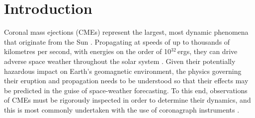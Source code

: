 \documentclass[referee,a4paper,12pt,traditabstract]{swsc}
\begin{document}
    


   \maketitle

\section{Introduction}

Coronal mass ejections (CMEs) represent the largest, most dynamic phenomena that originate from the Sun \citep{2011LRSP....8....1C,2012LRSP....9....3W}. Propagating at speeds of up to thousands of kilometres per second, with energies on the order of 10$^{32}$\,ergs, they can drive adverse space weather throughout the solar system \citep{2005A&A...440..373H,2007LRSP....4....1P}. Given their potentially hazardous impact on Earth's geomagnetic environment, the physics governing their eruption and propagation needs to be understood so that their effects may be predicted in the guise of space-weather forecasting. To this end, observations of CMEs must be rigorously inspected in order to determine their dynamics, and this is most commonly undertaken with the use of coronagraph instruments \citep[e.g.,][]{1975Koomen,1980ApJ...237L..99S,1980SoPh...65...91M,1985JGR....90..275I,1993JGR....9813177H, 1995SoPh..162..357B, 2008SSRv..136...67H}. 
\end{document}
